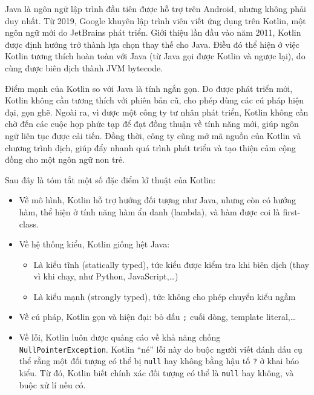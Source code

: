 \documentclass[../../thesis]{subfiles}
\begin{document}
Java là ngôn ngữ lập trình đầu tiên được hỗ trợ trên Android, nhưng không phải
duy nhất. Từ 2019, Google khuyên lập trình viên viết ứng dụng trên Kotlin, một
ngôn ngữ mới do JetBrains phát triển. Giới thiệu lần đầu vào năm 2011, Kotlin
được định hướng trở thành lựa chọn thay thế cho Java. Điều đó thể hiện ở việc
Kotlin tương thích hoàn toàn với Java (từ Java gọi được Kotlin và ngược lại), do
cùng được biên dịch thành JVM bytecode.

Điểm mạnh của Kotlin so với Java là tính ngắn gọn. Do được phát triển mới,
Kotlin không cần tương thích với phiên bản cũ, cho phép dùng các cú pháp hiện
đại, gọn ghẽ. Ngoài ra, vì được một công ty tư nhân phát triển, Kotlin không cần
chờ đến các cuộc họp phức tạp để đạt đồng thuận về tính năng mới, giúp ngôn ngữ
liên tục được cải tiến. Đồng thời, công ty cũng mở mã nguồn của Kotlin và chương
trình dịch, giúp đẩy nhanh quá trình phát triển và tạo thiện cảm cộng đồng cho
một ngôn ngữ non trẻ.

Sau đây là tóm tắt một số đặc điểm kĩ thuật của Kotlin:

\begin{itemize}
    \item
        Về mô hình, Kotlin hỗ trợ hướng đối tượng như Java, nhưng còn có hướng
        hàm, thể hiện ở tính năng hàm ẩn danh (lambda), và hàm được coi là
        first-class.
    \item
        Về hệ thống kiểu, Kotlin giống hệt Java:

        \begin{itemize}
            \item
                Là kiểu tĩnh (statically typed), tức kiểu được kiểm tra khi biên
                dịch (thay vì khi chạy, như Python, JavaScript,\ldots)
            \item
                Là kiểu mạnh (strongly typed), tức không cho phép chuyển kiểu
                ngầm
        \end{itemize}
    \item
        Về cú pháp, Kotlin gọn và hiện đại: bỏ dấu \texttt{;} cuối dòng,
        template literal,\ldots
    \item
        Về lỗi, Kotlin luôn được quảng cáo về khả năng chống
        \texttt{NullPointerException}. Kotlin ``né'' lỗi này do buộc người viết
        đánh dấu cụ thể rằng một đối tượng có thể bị \texttt{null} hay không
        bằng hậu tố \texttt{?} ở khai báo kiểu. Từ đó, Kotlin biết chính xác đối
        tượng có thể là \texttt{null} hay không, và buộc xử lí nếu có.
\end{itemize}
\end{document}
